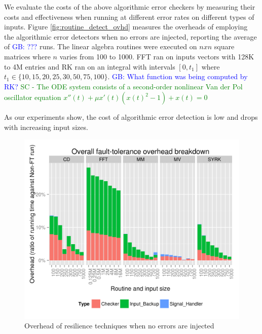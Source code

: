 \documentclass{sig-alternate}
\newcommand{\sui}[1]{%
  \textcolor{green}{SC - #1}
}
\newcommand{\greg}[1]{%
  \textcolor{blue}{GB: #1}
}
\begin{document}
We evaluate the costs of the above algorithmic error checkers by measuring their costs and effectiveness when running at different error rates on different types of inputs.
Figure \ref{fig:routine_detect_ovhd} measures the overheads of employing the algorithmic error detectors when no errors are injected, reporting the average of \greg{???} runs.
The linear algebra routines were executed on $nxn$ square matrices where $n$ varies from 100 to 1000.
FFT ran on inputs vectors with 128K to 4M entries and RK ran on an integral with intervals $[0, t_1]$ where $t_1 \in \{10, 15, 20, 25, 30, 50, 75, 100\}$. \greg{What function was being computed by RK?} \sui{The ODE system consists of a second-order nonlinear Van der Pol oscillator equation $x''(t)+\mu x'(t)(x(t)^2-1)+x(t)=0$}
As our experiments show, the cost of algorithmic error detection is low and drops with increasing input sizes.

\begin{figure}[ht!]
\centering
\includegraphics[width=1.00\columnwidth]{figs/4_1_1_Overall_Breakdown.png}
\caption{Overhead of resilience techniques when no errors are injected}
\label{fig:routine_all_ovhd}
\end{figure}
\end{document}
